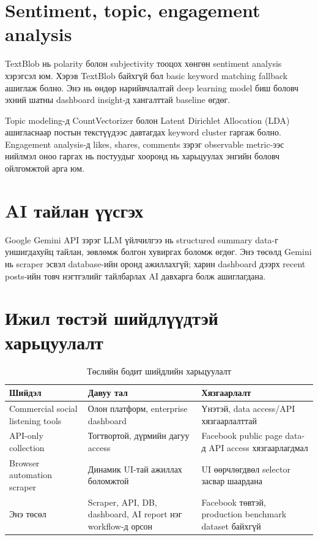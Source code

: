 \documentclass[
12pt,
oneside,
english,
onehalfspacing,
nolistspacing,
headsepline,
]{MUST-Thesis}
\begin{document}
\section{Sentiment, topic, engagement analysis}

TextBlob нь polarity болон subjectivity тооцох хөнгөн sentiment analysis хэрэгсэл юм. Хэрэв TextBlob байхгүй бол basic keyword matching fallback ашиглаж болно. Энэ нь өндөр нарийвчлалтай deep learning model биш боловч эхний шатны dashboard insight-д хангалттай baseline өгдөг.

Topic modeling-д CountVectorizer болон Latent Dirichlet Allocation (LDA) ашигласнаар постын текстүүдээс давтагдах keyword cluster гаргаж болно. Engagement analysis-д likes, shares, comments зэрэг observable metric-ээс нийлмэл оноо гаргах нь постуудыг хооронд нь харьцуулах энгийн боловч ойлгомжтой арга юм.

\section{AI тайлан үүсгэх}

Google Gemini API зэрэг LLM үйлчилгээ нь structured summary data-г уншигдахуйц тайлан, зөвлөмж болгон хувиргах боломж өгдөг. Энэ төсөлд Gemini нь scraper эсвэл database-ийн оронд ажиллахгүй; харин dashboard дээрх recent posts-ийн товч нэгтгэлийг тайлбарлах AI давхарга болж ашиглагдана.

\section{Ижил төстэй шийдлүүдтэй харьцуулалт}

\begin{table}[H]
\centering
\caption{Төслийн бодит шийдлийн харьцуулалт}
\small
\renewcommand{\arraystretch}{1.28}
\begin{adjustbox}{max width=\textwidth}
\begin{tabular}{|L{3.2cm}|L{5.1cm}|L{5.1cm}|}
\hline
{}\textbf{Шийдэл} & \textbf{Давуу тал} & \textbf{Хязгаарлалт} \\
\hline
Commercial social listening tools & Олон платформ, enterprise dashboard & Үнэтэй, data access/API хязгаарлалттай \\
\hline
API-only collection & Тогтвортой, дүрмийн дагуу access & Facebook public page data-д API access хязгаарлагдмал \\
\hline
Browser automation scraper & Динамик UI-тай ажиллах боломжтой & UI өөрчлөгдвөл selector засвар шаардана \\
\hline
Энэ төсөл & Scraper, API, DB, dashboard, AI report нэг workflow-д орсон & Facebook төвтэй, production benchmark dataset байхгүй \\
\hline
\end{tabular}
\end{adjustbox}
\normalsize
\end{table}
\end{document}
